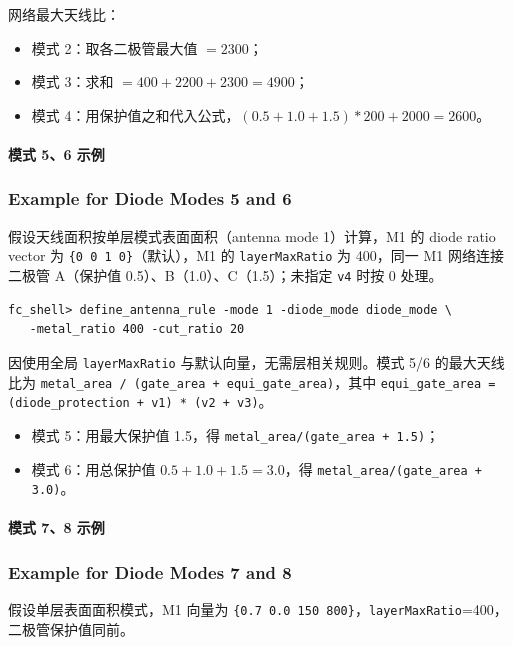 网络最大天线比：
\begin{itemize}
  \item 模式 2：取各二极管最大值 $=2300$；
  \item 模式 3：求和 $=400+2200+2300=4900$；
  \item 模式 4：用保护值之和代入公式，\((0.5+1.0+1.5)*200+2000=2600\)。
\end{itemize}

\paragraph{模式 5、6 示例}
\subsubsection*{Example for Diode Modes 5 and 6}

假设天线面积按单层模式表面面积（antenna mode 1）计算，M1 的 diode ratio vector 为 \texttt{\{0 0 1 0\}}（默认），M1 的 \texttt{layerMaxRatio} 为 400，同一 M1 网络连接二极管 A（保护值 0.5）、B（1.0）、C（1.5）；未指定 \texttt{v4} 时按 0 处理。

\begin{lstlisting}
fc_shell> define_antenna_rule -mode 1 -diode_mode diode_mode \
   -metal_ratio 400 -cut_ratio 20
\end{lstlisting}

因使用全局 \texttt{layerMaxRatio} 与默认向量，无需层相关规则。模式 5/6 的最大天线比为
\texttt{metal\_area / (gate\_area + equi\_gate\_area)}，其中
\texttt{equi\_gate\_area = (diode\_protection + v1) * (v2 + v3)}。
\begin{itemize}
  \item 模式 5：用最大保护值 1.5，得 \texttt{metal\_area/(gate\_area + 1.5)}；
  \item 模式 6：用总保护值 \(0.5+1.0+1.5=3.0\)，得 \texttt{metal\_area/(gate\_area + 3.0)}。
\end{itemize}

\paragraph{模式 7、8 示例}
\subsubsection*{Example for Diode Modes 7 and 8}

假设单层表面面积模式，M1 向量为 \texttt{\{0.7 0.0 150 800\}}，\texttt{layerMaxRatio}=400，二极管保护值同前。

